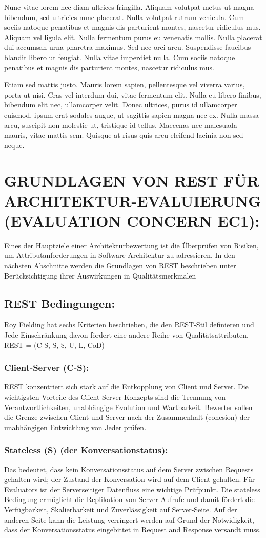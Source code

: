 \documentclass{acmsiggraph}
\begin{document}
Nunc vitae lorem nec diam ultrices fringilla. Aliquam volutpat metus ut magna bibendum, sed ultricies nunc placerat. Nulla volutpat rutrum vehicula. Cum sociis natoque penatibus et magnis dis parturient montes, nascetur ridiculus mus. Aliquam vel ligula elit. Nulla fermentum purus eu venenatis mollis. Nulla placerat dui accumsan urna pharetra maximus. Sed nec orci arcu. Suspendisse faucibus blandit libero ut feugiat. Nulla vitae imperdiet nulla. Cum sociis natoque penatibus et magnis dis parturient montes, nascetur ridiculus mus.

Etiam sed mattis justo. Mauris lorem sapien, pellentesque vel viverra varius, porta ut nisi. Cras vel interdum dui, vitae fermentum elit. Nulla eu libero finibus, bibendum elit nec, ullamcorper velit. Donec ultrices, purus id ullamcorper euismod, ipsum erat sodales augue, ut sagittis sapien magna nec ex. Nulla massa arcu, suscipit non molestie ut, tristique id tellus. Maecenas nec malesuada mauris, vitae mattis sem. Quisque at risus quis arcu eleifend lacinia non sed neque.
\section{GRUNDLAGEN VON REST FÜR ARCHITEKTUR-EVALUIERUNG (EVALUATION CONCERN EC1):}
Eines der Hauptziele einer Architekturbewertung ist die Überprüfen von Risiken, um Attributanforderungen in Software Architektur zu adressieren.
In den nächsten Abschnitte werden die Grundlagen von REST beschrieben unter Berücksichtigung ihrer Auswirkungen in Qualitätsmerkmalen

\subsection{REST Bedingungen:}
Roy Fielding hat sechs Kriterien beschrieben, die den REST-Stil definieren und Jede Einschränkung davon fördert eine andere Reihe von Qualitätsattributen.
REST = (C-S, S, \$, U, L, CoD)
\subsubsection{Client-Server (C-S):}
REST konzentriert sich stark auf die Entkopplung von Client und Server.
Die wichtigsten Vorteile des Client-Server Konzepts sind die Trennung von Verantwortlichkeiten, unabhängige Evolution und Wartbarkeit.
Bewerter sollen die Grenze zwischen Client und Server nach der Zusammenhalt  (cohesion) der unabhängigen Entwicklung von Jeder prüfen.  

\subsubsection{Stateless (S) (der Konversationstatus):}
Das bedeutet, dass kein Konversationsstatus auf dem Server zwischen Requests gehalten wird; der Zustand der Konversation wird auf dem Client gehalten.
Für Evaluators ist der Serverseitiger  Datenfluss  eine wichtige Prüfpunkt.
Die stateless Bedingung ermöglicht die Replikation von Server-Aufrufe und damit fördert die Verfügbarkeit, Skalierbarkeit und Zuverlässigkeit auf Server-Seite. 
Auf der anderen Seite kann die Leistung verringert werden auf Grund der Notwidigkeit, dass  der Konversationsstatus eingebittet in Request and Response versandt muss.
\end{document}
